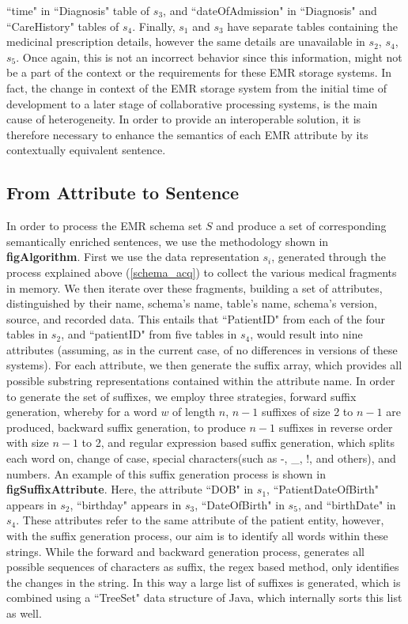 ``time" in ``Diagnosis" table of $s_3$, and  ``dateOfAdmission" in ``Diagnosis" and ``CareHistory" tables of $s_4$.
Finally, $s_1$ and $s_3$ have separate tables containing the medicinal prescription details, however the same details are unavailable in $s_2$, $s_4$, $s_5$. Once again, this is not an incorrect behavior since this information, might not be a part of the context or the requirements for these EMR storage systems.
In fact, the change in context of the EMR storage system from the initial time of development to a later stage of collaborative processing systems, is the main cause of heterogeneity. In order to provide an interoperable solution, it is therefore necessary to enhance the semantics of each EMR attribute by its contextually equivalent sentence. 

\subsection*{From Attribute to Sentence}
\label{schema_prepro}
In order to process the EMR schema set $S$ and produce a set of corresponding semantically enriched sentences, we use the methodology shown in \textbf{figAlgorithm}.
First we use the data representation $s_i$, generated through the process explained above (\ref{schema_acq}) to collect the various medical fragments in memory. We then iterate over these fragments, building a set of attributes, distinguished by their name, schema's name, table's name, schema's version, source, and recorded data. This entails that ``PatientID" from each of the four tables in $s_2$, and ``patientID" from five tables in $s_4$, would result into nine attributes (assuming, as in the current case, of no differences in versions of these systems).
For each attribute, we then generate the suffix array, which provides all possible substring representations contained within the attribute name. In order to generate the set of suffixes, we employ three strategies, forward suffix generation, whereby for a word $w$ of length $n$, $n-1$ suffixes of size 2 to $n-1$ are produced, backward suffix generation, to produce $n-1$ suffixes in reverse order with size $n-1$ to 2, and regular expression based suffix generation, which splits each word on, change of case, special characters(such as -, \_, !, and others), and numbers. An example of this suffix generation process is shown in \textbf{figSuffixAttribute}. 
Here, the attribute ``DOB" in $s_1$, ``PatientDateOfBirth" appears in $s_2$, ``birthday" appears in $s_3$, ``DateOfBirth" in $s_5$, and ``birthDate" in $s_4$. These attributes refer to the same attribute of the patient entity, however, with the suffix generation process, our aim is to identify all words within these strings. While the forward and backward generation process, generates all possible sequences of characters as suffix, the regex based method, only identifies the changes in the string. In this way a large list of suffixes is generated, which is combined using a ``TreeSet" data structure of Java, which internally sorts this list as well.

